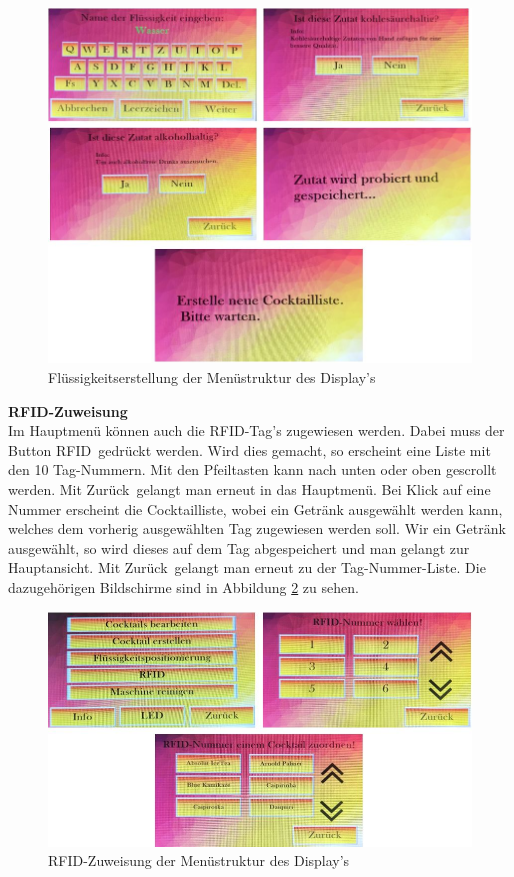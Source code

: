 \begin{figure}[H]
	\centering
	\includegraphics[width=\textwidth]{graphics/DisplayPositionierung2}
	\caption{Flüssigkeitserstellung der Menüstruktur des Display's}
	\label{fig:DisplayPositionierung2}
\end{figure}

\textbf{RFID-Zuweisung}\\
Im Hauptmenü können auch die RFID-Tag's zugewiesen werden. Dabei muss der Button \flqq RFID\frqq~gedrückt werden. Wird dies gemacht, so erscheint eine Liste mit den 10 Tag-Nummern. Mit den Pfeiltasten kann nach unten oder oben gescrollt werden. Mit \flqq Zurück\frqq~gelangt man erneut in das Hauptmenü. Bei Klick auf eine Nummer erscheint die Cocktailliste, wobei ein Getränk ausgewählt werden kann, welches dem vorherig ausgewählten Tag zugewiesen werden soll. Wir ein Getränk ausgewählt, so wird dieses auf dem Tag abgespeichert und man gelangt zur Hauptansicht. Mit \flqq Zurück\frqq~gelangt man erneut zu der Tag-Nummer-Liste. Die dazugehörigen Bildschirme sind in Abbildung \ref{fig:DisplayRFID} zu sehen. 

\begin{figure}[H]
	\centering
	\includegraphics[width=\textwidth]{graphics/DisplayRFID}
	\caption{RFID-Zuweisung der Menüstruktur des Display's}
	\label{fig:DisplayRFID}
\end{figure}

